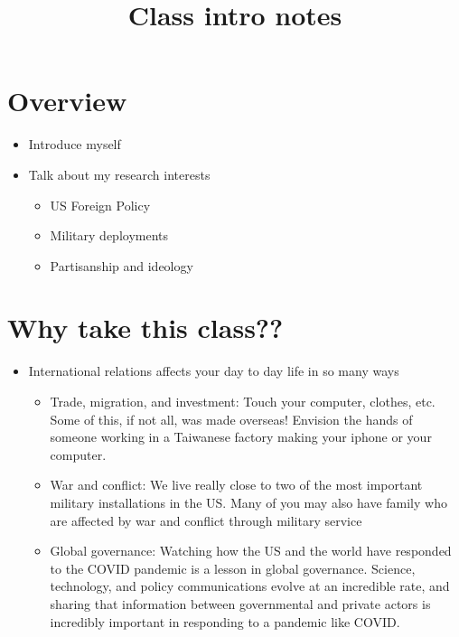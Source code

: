 \documentclass[
  12pt,
]{article}
\title{Class intro notes}
\author{}
\date{\vspace{-2.5em}}
\begin{document}
\maketitle

\hypertarget{overview}{%
\section{Overview}\label{overview}}

\begin{itemize}
\item
  Introduce myself
\item
  Talk about my research interests

  \begin{itemize}
  \item
    US Foreign Policy
  \item
    Military deployments
  \item
    Partisanship and ideology
  \end{itemize}
\end{itemize}

\hypertarget{why-take-this-class}{%
\section{Why take this class??}\label{why-take-this-class}}

\begin{itemize}
\item
  International relations affects your day to day life in so many ways

  \begin{itemize}
  \item
    Trade, migration, and investment: Touch your computer, clothes, etc.
    Some of this, if not all, was made overseas! Envision the hands of
    someone working in a Taiwanese factory making your iphone or your
    computer.
  \item
    War and conflict: We live really close to two of the most important
    military installations in the US. Many of you may also have family
    who are affected by war and conflict through military service
  \item
    Global governance: Watching how the US and the world have responded
    to the COVID pandemic is a lesson in global governance. Science,
    technology, and policy communications evolve at an incredible rate,
    and sharing that information between governmental and private actors
    is incredibly important in responding to a pandemic like COVID.
  \end{itemize}
\end{itemize}
\end{document}
